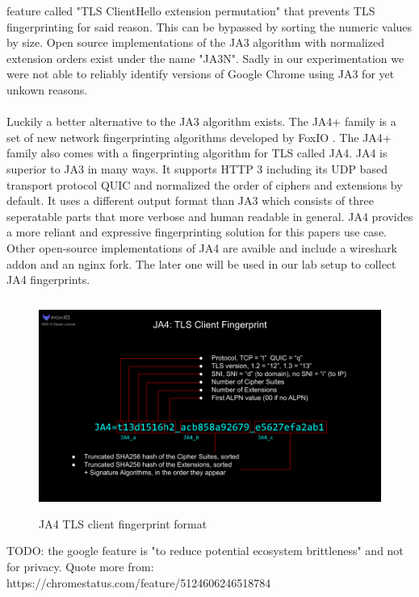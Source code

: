 \documentclass[12pt]{scrbook}
\begin{document}
feature called "TLS ClientHello extension permutation" that prevents TLS
fingerprinting for said reason. This can be bypassed by sorting the numeric
values by size. Open source implementations of the JA3 algorithm with
normalized extension orders exist under the name "JA3N". Sadly in our
experimentation we were not able to reliably identify versions of Google
Chrome using JA3 for yet unkown reasons.\\ \\ Luckily a better alternative
to the JA3 algorithm exists. The JA4+ family is a set of new network
fingerprinting algorithms developed by FoxIO \cite{foxIOJa4}. The JA4+
family also comes with a fingerprinting algorithm for TLS called JA4. JA4 is
superior to JA3 in many ways. It supports HTTP 3 including its UDP based
transport protocol QUIC and normalized the order of ciphers and extensions
by default. It uses a different output format than JA3 which consists of
three seperatable parts that more verbose and human readable in general. JA4
provides a more reliant and expressive fingerprinting solution for this
papers use case. Other open-source implementations of JA4 are avaible and
include a wireshark addon and an nginx fork. The later one will be used in
our lab setup to collect JA4 fingerprints.

\begin{figure}[!htb] \centering
  \includegraphics[height=7cm]{./images/JA4.png} \caption{JA4 TLS client
fingerprint format} \end{figure}

TODO: the google feature is "to reduce potential ecosystem brittleness" and
not for privacy. Quote more from:
https://chromestatus.com/feature/5124606246518784
\end{document}
